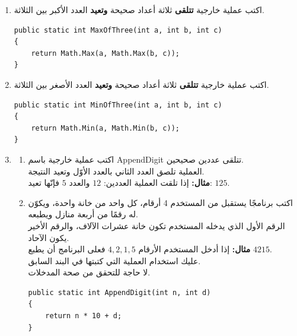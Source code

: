 ﻿\documentclass[12pt]{article}
\begin{document}
\begin{enumerate}[itemsep=3em]
\begin{enumerate}
\item اكتب عملية خارجية \textbf{تتلقى} ثلاثة أعداد صحيحة \textbf{وتعيد} العدد الأكبر بين الثلاثة.
\ifwithsols
\begin{boxSolution}
\begin{english}
\begin{verbatim}
public static int MaxOfThree(int a, int b, int c)
{
    return Math.Max(a, Math.Max(b, c));
}
\end{verbatim}
\end{english}
\end{boxSolution}
\fi


\item اكتب عملية خارجية \textbf{تتلقى} ثلاثة أعداد صحيحة \textbf{وتعيد} العدد الأصغر بين الثلاثة.
\ifwithsols
\begin{boxSolution}
\begin{english}
\begin{verbatim}
public static int MinOfThree(int a, int b, int c)
{
    return Math.Min(a, Math.Min(b, c));
}
\end{verbatim}
\end{english}
\end{boxSolution}
\fi



\clearpage

\item
\begin{enumerate}
    \item اكتب عملية خارجية باسم \textenglish{AppendDigit} تتلقى عددين صحيحين. \\
    العملية تلصق العدد الثاني بالعدد الأوّل وتعيد النتيجة. \\
    \textbf{مثال:} إذا تلقت العملية العددين: $12$ والعدد $5$ فإنّها تعيد: $125$.
    \item اكتب برنامجًا يستقبل من المستخدم 4 أرقام، كل واحد من خانة واحدة، ويكوّن له رقمًا من أربعة منازل ويطبعه. \\
    الرقم الأول الذي يدخله المستخدم تكون خانة عشرات الآلاف، والرقم الأخير يكون الآحاد. \\
    \textbf{مثال:} إذا أدخل المستخدم الأرقام $4,2,1,5$ فعلى البرنامج أن يطبع $4215$. \\
    عليك استخدام العملية التي كتبتها في البند السابق. \\
    لا حاجة للتحقق من صحة المدخلات.
\ifwithsols
\begin{boxSolution}
\begin{english}
\begin{verbatim}
public static int AppendDigit(int n, int d)
{
    return n * 10 + d;
}


\end{verbatim}
\end{english}
\end{boxSolution}
\end{enumerate}
\end{enumerate}
\end{enumerate}
\end{document}
